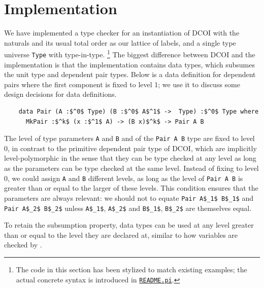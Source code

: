\documentclass[acmsmall]{acmart}
\newcommand{\scw}[1]{}
\newcommand{\jc}[1]{}
\newcommand{\name}{DCOI\xspace}
\newcommand{\dotpi}[2]{\href{#1/#2}{\texttt{#2}}}
\newlength{\punctwidth}
\newcommand{\punctstack}[1]{#1%
  \settowidth{\punctwidth}{#1}%
  \hspace*{-\the\punctwidth}%
}
\begin{document}
\section{Implementation}
\label{sec:implementation}

We have implemented a type checker for an instantiation
of \name{} with the naturals and its usual total order as our lattice of labels,
and a single type universe \lstinline{Type} with type-in-type\punctstack{.}%
\footnote{The code in this section has been stylized to match existing examples;
the actual concrete syntax is introduced in \dotpi{impl}{README.pi}.}
The biggest difference between \name{} and the implementation is that
the implementation contains data types,
which subsumes the unit type and dependent pair types.
Below is a data definition for dependent pairs
where the first component is fixed to level 1;
we use it to discuss some design decisions for data definitions.

\begin{lstlisting}
    data Pair (A :$^0$ Type) (B :$^0$ A$^1$ ->  Type) :$^0$ Type where
      MkPair :$^k$ (x :$^1$ A) -> (B x)$^k$ -> Pair A B
\end{lstlisting}

The level of type parameters \lstinline{A} and \lstinline{B}
and of the \lstinline{Pair A B} type are fixed to level 0,
in contrast to the primitive dependent pair type of \name{},
which are implicitly level-polymorphic in the sense that they can be
type checked at any level
as long as the parameters can be type checked at the same level.
Instead of fixing to level 0, we could assign \lstinline{A} and \lstinline{B} different levels,
as long as the level of \lstinline{Pair A B} is greater than or equal to
the larger of these levels. This condition ensures that the parameters are always relevant:
we should not to equate \lstinline{Pair A$_1$ B$_1$} and \lstinline{Pair A$_2$ B$_2$}
unless \lstinline{A$_1$}, \lstinline{A$_2$} and \lstinline{B$_1$}, \lstinline{B$_2$} are themselves equal.
\scw{Is there a sound extension that allows irrelevant parameters to datatypes?}
\jc{Seems unlikely. The parameter would probably have to never be used later,
but if that were the case, why would the parameter exist at all?
If there's a different scenario where it's irrelevant but also used in a valid way,
we could speculate in the extensions section.}
To retain the subsumption property, data types can be used at any level
greater than or equal to the level they are declared at,
similar to how variables are checked by .
\end{document}
